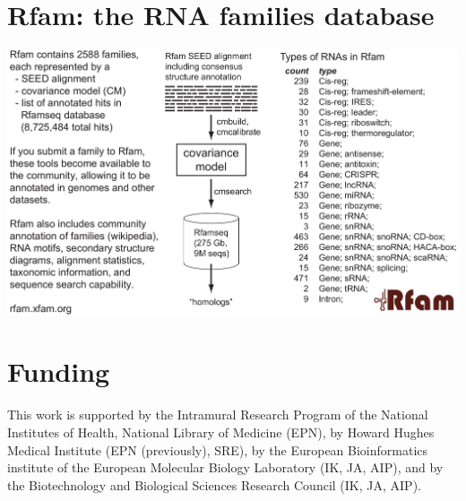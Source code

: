 \documentclass[custom,landscape,final,30pt,plainboxedsections]{sciposter-titleskipsmall}
\begin{document}
\begin{multicols}{3}
\vspace{0.5in}

\section*{Rfam: the RNA families database \cite{Nawrocki15}}

\begin{center}
\includegraphics[width=13.5in]{figs/rfam-poster}
\end{center}

\section*{Funding}
\begin{footnotesize}
This work is supported by the Intramural Research Program of the
National Institutes of Health, National Library of Medicine (EPN), 
by Howard Hughes Medical Institute (EPN (previously), SRE), by the European
Bioinformatics institute of the European Molecular Biology Laboratory
(IK, JA, AIP), and by the Biotechnology and Biological Sciences
Research Council (IK, JA, AIP).
\end{footnotesize}


\begin{tiny}

\end{tiny}

\end{multicols}
\end{document}
